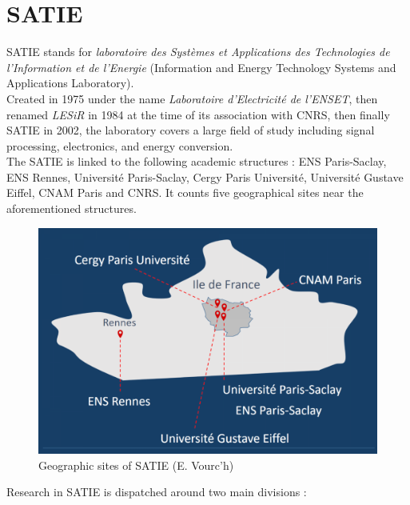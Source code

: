 \documentclass[titlepage,11pt]{article}
\begin{document}
	\newpage
	\tableofcontents
	
		\newpage
	\part{SATIE}
	
	SATIE stands for \emph{laboratoire des Systèmes et Applications des Technologies de l'Information et de l'Energie} (Information and Energy Technology Systems and Applications Laboratory).\\
	Created in 1975 under the name \emph{Laboratoire d'Electricité de l'ENSET}, then renamed \emph{LESiR} in 1984 at the time of its association with CNRS, then finally SATIE in 2002, the laboratory covers a large field of study including signal processing, electronics, and energy conversion.\\
	
	The SATIE is linked to the following academic structures : ENS Paris-Saclay, ENS Rennes, Université Paris-Saclay, Cergy Paris Université, Université Gustave Eiffel, CNAM Paris and CNRS. It counts five geographical sites near the aforementioned structures. 
	
	\begin{figure}[H]
		\centering
		\includegraphics[width=0.7\linewidth]{src/sites_geoo_satie}
		\caption{Geographic sites of SATIE (\textcopyright E. Vourc'h)}
		\label{fig:sitesgeoosatie}
	\end{figure}
	
	Research in SATIE is dispatched around two main divisions :
	
\end{document}
